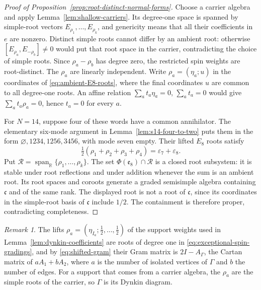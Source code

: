 \documentclass{article}
\theoremstyle{definition}
\theoremstyle{remark}
\newtheorem{remark}[theorem]{Remark}
\begin{document}
\begin{proof}[Proof of Proposition~\ref{prop:root-distinct-normal-forms}]
Choose a carrier algebra and apply Lemma~\ref{lem:shallow-carriers}.
Its degree-one space is spanned by simple-root vectors
$E_{\rho_1},\ldots,E_{\rho_k}$, and genericity means that all their
coefficients in $e$ are nonzero. Distinct simple roots cannot differ by
an ambient root: otherwise
$[E_{\rho_a},E_{-\rho_b}]\ne0$ would put that root space in the carrier,
contradicting the choice of simple roots. Since $\rho_a-\rho_b$ has degree zero, the
restricted spin weights are root-distinct. The $\rho_a$ are linearly
independent. Write $\rho_a=(\eta_a;u)$ in the coordinates of
\eqref{eq:ambient-E8-roots}, where the final coordinates $u$ are common
to all degree-one roots. An affine relation
$\sum_a t_a\eta_a=0$, $\sum_a t_a=0$ would give
$\sum_a t_a\rho_a=0$, hence $t_a=0$ for every $a$.

For $N=14$, suppose four of these words have a common annihilator.
The elementary six-mode argument in
Lemma~\ref{lem:s14-four-to-two} puts them in the form
$\varnothing,1234,1256,3456$, with mode seven empty. Their lifted
$E_8$ roots satisfy
\begin{equation}
 \tfrac12(\rho_1+\rho_2+\rho_3+\rho_4)
   =\varepsilon_7+\varepsilon_8.
\end{equation}
Put $\mathcal R=\operatorname{span}_{\mathbb R}\{\rho_1,\ldots,\rho_k\}$.
The set $\Phi(\mathfrak e_8)\cap\mathcal R$ is a closed root subsystem:
it is stable under root reflections and under addition whenever the
sum is an ambient root. Its root spaces and coroots generate a graded
semisimple algebra containing $\mathfrak c$ and of the same rank.
The displayed root is not a root of $\mathfrak c$, since its
coordinates in the simple-root basis of $\mathfrak c$ include $1/2$.
The containment is therefore proper, contradicting completeness.
\end{proof}

\begin{remark}
\label{rem:carrier-dynkin}
The lifts $\rho_a=(\eta_{I_a};\frac12,\ldots,\frac12)$ of the support weights
used in Lemma~\ref{lem:dynkin-coefficients} are roots of degree one in
\eqref{eq:exceptional-spin-gradings}, and by \eqref{eq:shifted-gram} their Gram
matrix is $2I-A_\Gamma$, the Cartan matrix of $aA_1+bA_2$, where $a$ is the
number of isolated vertices of $\Gamma$ and $b$ the number of edges. For a
support that comes from a carrier algebra, the $\rho_a$ are the simple roots of
the carrier, so $\Gamma$ is its Dynkin diagram.
\end{remark}
\end{document}
